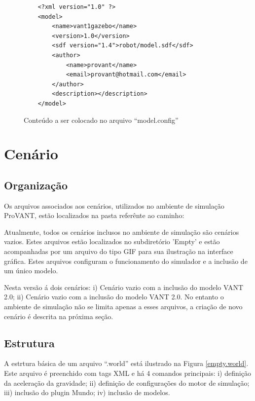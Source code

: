 \begin{figure}[ht!]
	\begin{verbatim}
	<?xml version="1.0" ?>
	<model>
		<name>vant1gazebo</name>
		<version>1.0</version>
		<sdf version="1.4">robot/model.sdf</sdf>
		<author>
			<name>provant</name>
			<email>provant@hotmail.com</email>
		</author>
		<description></description>
	</model>
	\end{verbatim}
	\caption{Conteúdo a ser colocado no arquivo ``model.config''}
	\label{modelconfig}
\end{figure}

\chapter{Cenário}

\section{Organização}

Os arquivos associados aos cenários, utilizados no ambiente de simulação ProVANT, estão localizados na pasta referênte ao caminho:


Atualmente, todos os cenários inclusos no ambiente de simulação são cenários vazios. Estes arquivos estão localizados no subdiretório 'Empty' e estão acompanhadas por um arquivo do tipo GIF para sua ilustração na interface gráfica. Estes arquivos configuram o funcionamento do simulador e a inclusão de um único modelo. 

Nesta versão á dois cenários: i) Cenário vazio com a inclusão do modelo VANT 2.0; ii) Cenário vazio com a inclusão do modelo VANT 2.0. No entanto o ambiente de simulação não se limita apenas a esses arquivos, a criação de novo cenário é descrita na próxima seção.

\section{Estrutura}

A estrtura básica de um arquivo ``.world'' está ilustrado na Figura \ref{empty.world}. Este arquivo é preenchido com tags XML e há 4 comandos principais: i) definição da aceleração da gravidade; ii) definição de configurações do motor de simulação; iii) inclusão do plugin Mundo; iv) inclusão de modelos.


